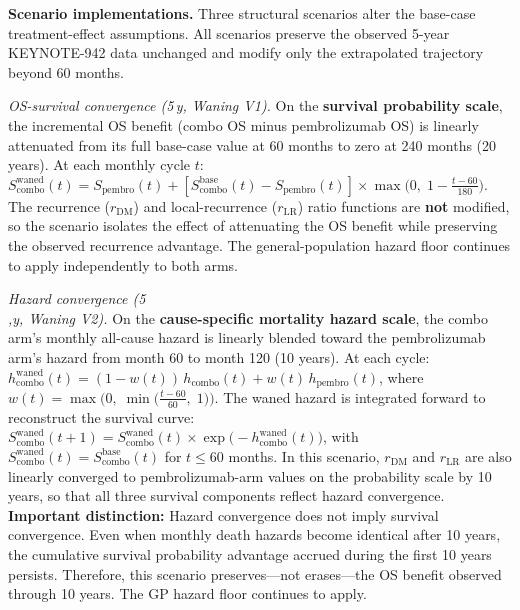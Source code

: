 \documentclass[11pt,a4paper]{article}
\begin{document}
\noindent\textbf{Scenario implementations.} Three structural scenarios alter the base-case treatment-effect assumptions. All scenarios preserve the observed 5-year KEYNOTE-942 data unchanged and modify only the extrapolated trajectory beyond 60 months.

\textit{OS-survival convergence (5\,y, Waning V1).} On the \textbf{survival probability scale}, the incremental OS benefit (combo OS minus pembrolizumab OS) is linearly attenuated from its full base-case value at 60 months to zero at 240 months (20 years). At each monthly cycle $t$: $S_{\text{combo}}^{\text{waned}}(t) = S_{\text{pembro}}(t) + [S_{\text{combo}}^{\text{base}}(t) - S_{\text{pembro}}(t)] \times \max\bigl(0,\; 1 - \frac{t - 60}{180}\bigr)$. The recurrence ($r_{\text{DM}}$) and local-recurrence ($r_{\text{LR}}$) ratio functions are \textbf{not} modified, so the scenario isolates the effect of attenuating the OS benefit while preserving the observed recurrence advantage. The general-population hazard floor continues to apply independently to both arms.

\textit{Hazard convergence (5\\,y, Waning V2).} On the \textbf{cause-specific mortality hazard scale}, the combo arm's monthly all-cause hazard is linearly blended toward the pembrolizumab arm's hazard from month 60 to month 120 (10 years). At each cycle: $h_{\text{combo}}^{\text{waned}}(t) = (1 - w(t))\,h_{\text{combo}}(t) + w(t)\,h_{\text{pembro}}(t)$, where $w(t) = \max\bigl(0,\; \min\bigl(\frac{t - 60}{60},\; 1\bigr)\bigr)$. The waned hazard is integrated forward to reconstruct the survival curve: $S_{\text{combo}}^{\text{waned}}(t+1) = S_{\text{combo}}^{\text{waned}}(t) \times \exp\bigl(-h_{\text{combo}}^{\text{waned}}(t)\bigr)$, with $S_{\text{combo}}^{\text{waned}}(t) = S_{\text{combo}}^{\text{base}}(t)$ for $t \leq 60$ months. In this scenario, $r_{\text{DM}}$ and $r_{\text{LR}}$ are also linearly converged to pembrolizumab-arm values on the probability scale by 10 years, so that all three survival components reflect hazard convergence. \textbf{Important distinction:} Hazard convergence does not imply survival convergence. Even when monthly death hazards become identical after 10 years, the cumulative survival probability advantage accrued during the first 10 years persists. Therefore, this scenario preserves---not erases---the OS benefit observed through 10 years. The GP hazard floor continues to apply.
\end{document}
